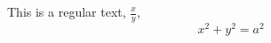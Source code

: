 \documentclass[preview]{standalone}
\begin{document}
\begin{center}
This is a regular text,
            $\frac{x}{y}$,
            $$x^2+y^2=a^2$$
\end{center}
\end{document}
